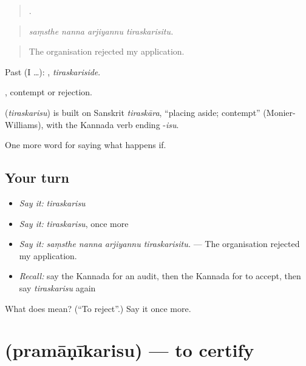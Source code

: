 \begin{quote}
   .
\end{quote}

\begin{quote}
\emph{saṃsthe nanna arjiyannu tiraskarisitu.}
\end{quote}

\begin{quote}
The organisation rejected my application.
\end{quote}

Past (I …): , \emph{tiraskariside}.

, contempt or rejection.

\begin{cousinweb}
\textbf{} (\emph{tiraskarisu}) is built on Sanskrit \emph{tiraskāra}, \textquotedblleft{}placing aside; contempt\textquotedblright{} (Monier-Williams), with the Kannada verb ending -\emph{isu}.
\end{cousinweb}

\begin{grammarlens}[title={What you've built}]
One more word for saying what happens if.
\end{grammarlens}

\subsection*{Your turn}
\begin{itemize}
\raggedright
  \item \emph{Say it:} \emph{tiraskarisu}
  \item \emph{Say it:} \emph{tiraskarisu}, once more
  \item \emph{Say it:} \emph{saṃsthe nanna arjiyannu tiraskarisitu.} — The organisation rejected my application.
  \item \emph{Recall:} say the Kannada for an audit, then the Kannada for to accept, then say \emph{tiraskarisu} again
\end{itemize}

\begin{tcolorbox}[breakable,colback=teal!4,colframe=teal!35!black,title={Before you move on}]
What does  mean? (\textquotedblleft{}To reject\textquotedblright{}.) Say it once more.
\end{tcolorbox}
\section[\texorpdfstring{\kn{ಪ್ರಮಾಣೀಕರಿಸು} (pramāṇīkarisu)}{ಪ್ರಮಾಣೀಕರಿಸು (pramāṇīkarisu)}]{ (pramāṇīkarisu) — to certify}

